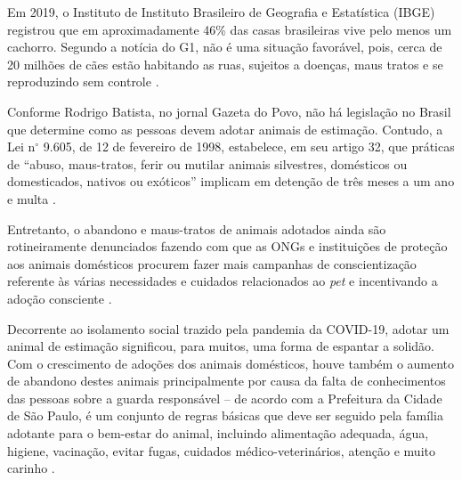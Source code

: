 Em 2019, o Instituto de Instituto Brasileiro de Geografia e Estatística (IBGE) registrou que em aproximadamente 46\% das casas brasileiras vive pelo menos um cachorro. Segundo a notícia do G1, não é uma situação favorável, pois, cerca de 20 milhões de cães estão habitando as ruas, sujeitos a doenças, maus tratos e se reproduzindo sem controle \cite{adocao_conscientetres,adocao_conscientecinco}.

Conforme Rodrigo Batista, no jornal Gazeta do Povo, não há legislação no Brasil que determine como as pessoas devem adotar animais de estimação. Contudo, a Lei n$^\circ$ 9.605, de 12 de fevereiro de 1998, estabelece, em seu artigo 32, que práticas de “abuso, maus-tratos, ferir ou mutilar animais silvestres, domésticos ou domesticados, nativos ou exóticos” implicam em detenção de três meses a um ano e multa \cite{adocao_consciente}.

Entretanto, o abandono e maus-tratos de animais adotados ainda são rotineiramente denunciados fazendo com que as \ac{ONGs} e instituições de proteção aos animais domésticos procurem fazer mais campanhas de conscientização referente às várias necessidades e cuidados relacionados ao \textit{pet} e incentivando a adoção consciente \cite{adocao_consciente}.  

Decorrente ao isolamento social trazido pela pandemia da \gls{COVID-19}, adotar um animal de estimação significou, para muitos, uma forma de espantar a solidão. Com o crescimento de adoções dos animais domésticos, houve também o aumento de abandono destes animais principalmente por causa da falta de conhecimentos das pessoas sobre a guarda responsável  – de acordo com a Prefeitura da Cidade de São Paulo, é um conjunto de regras básicas que deve ser seguido pela família adotante para o bem-estar do animal, incluindo alimentação adequada,  água, higiene, vacinação, evitar fugas, cuidados médico-veterinários, atenção e muito carinho \cite{adocao_conscientequatro}.


